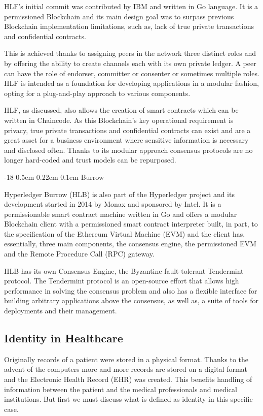 \documentclass[]{llncs}
\makeatletter
\renewcommand\subsubsection{\@startsection{subsubsection}{3}{\z@}%
                       {-18\p@ \@plus -4\p@ \@minus -4\p@}%
                       {0.5em \@plus 0.22em \@minus 0.1em}%
                       {\normalfont\normalsize\bfseries\boldmath}}
\makeatother
\begin{document}
HLF’s initial commit was contributed by IBM and written in Go language.  It is
a permissioned Blockchain and its main design goal was to surpass previous
Blockchain implementation limitations, such as, lack of true private
transactions and confidential contracts.

This is achieved thanks to assigning peers in the network three distinct roles
and by offering the ability to create channels each with its own private
ledger.  A peer can have the role of endorser, committer or consenter or
sometimes multiple roles.  HLF is intended as a foundation for developing
applications in a modular fashion, opting for a plug-and-play approach to
various components. \cite{HyperledgerFabricDocs2017}

HLF, as discussed, also allows the creation of smart contracts which can be
written in Chaincode.  As this Blockchain's key operational requirement is
privacy, true private transactions and confidential contracts can exist and are
a great asset for a business environment where sensitive information is
necessary and disclosed often.  Thanks to its modular approach consensus
protocols are no longer hard-coded and trust models can be repurposed.

\subsubsection{Burrow}

Hyperledger Burrow (HLB) is also part of the Hyperledger project and its
development started in 2014 by Monax and sponsored by Intel. It is a
permissionable smart contract machine written in Go and offers a modular
Blockchain client with a permissioned smart contract interpreter built, in
part, to the specification of the Ethereum Virtual Machine (EVM) and the client
has, essentially, three main components, the consensus engine, the permissioned
EVM and the Remote Procedure Call (RPC) gateway.
\cite{Kuhlman2017,HyperledgerBurrow2017}

HLB has its own Consensus Engine, the Byzantine fault-tolerant Tendermint
protocol.  The Tendermint protocol is an open-source effort that allows high
performance in solving the consensus problem and also has a flexible interface
for building arbitrary applications above the consensus, as well as, a suite of
tools for deployments and their management. \cite{Buchman2016}
%

\subsection{Identity in Healthcare} Originally records of a patient were stored
in a physical format.  Thanks to the advent of the computers more and more
records are stored on a digital format and the Electronic Health Record (EHR)
was created.  This benefits handling of information between the patient and the
medical professionals and medical institutions. But first we must discuss what
is defined as identity in this specific case.
\end{document}
